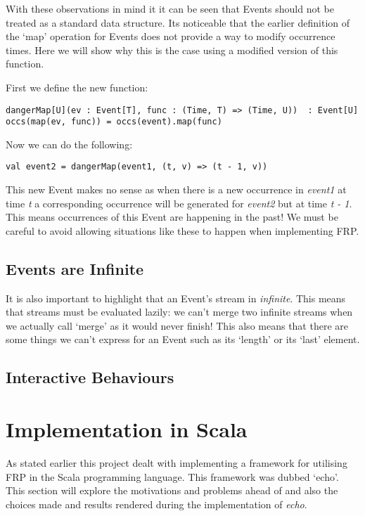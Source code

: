 \documentclass[12pt]{article}
\begin{document}
      With these observations in mind it it can be seen that Events should not be treated as a
      standard data structure. Its noticeable that the earlier definition of the `map' operation for
      Events does not provide a way to modify occurrence times. Here we will show why this is
      the case using a modified version of this function.
      
      First we define the new function:
      
\begin{verbatim}
dangerMap[U](ev : Event[T], func : (Time, T) => (Time, U))  : Event[U]
occs(map(ev, func)) = occs(event).map(func)
\end{verbatim}

      Now we can do the following:
      
\begin{verbatim}
val event2 = dangerMap(event1, (t, v) => (t - 1, v))
\end{verbatim}

      This new Event makes no sense as when there is a new occurrence in \emph{event1} at time 
      \emph{t} a corresponding occurrence will be generated for \emph{event2} but at time 
      \emph{t - 1}. This means occurrences of this Event are happening in the past! We must
      be careful to avoid allowing situations like these to happen when implementing FRP.
      
    \subsection{Events are Infinite}  
      It is also important to highlight that an Event's stream in \emph{infinite}. This means
      that streams must be evaluated lazily: we can't merge two infinite streams when we actually
      call `merge' as it would never finish! This also means that there are some things we
      can't express for an Event such as its `length' or its `last' element.
    
      
    \subsection{Interactive Behaviours}
    
  \section{Implementation in Scala}
    As stated earlier this project dealt with implementing a framework for utilising FRP in the Scala programming
    language. This framework was dubbed `echo'. This section will explore the motivations and problems ahead of
    and also the choices made and results rendered during the implementation of \emph{echo}.
    
\end{document}
